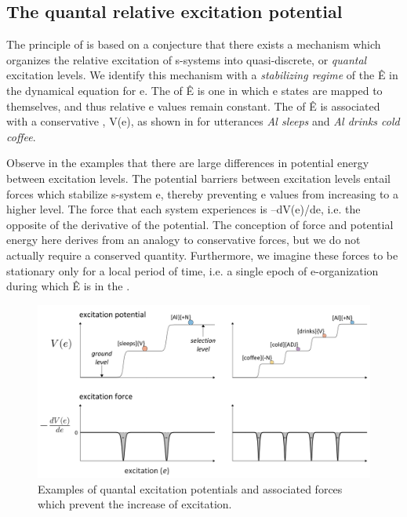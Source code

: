 \subsection{The quantal relative excitation potential}

The principle of  is based on a conjecture that there exists a mechanism which organizes the relative excitation of s-systems into quasi-discrete, or \textit{quantal} excitation levels. We identify this mechanism with a \textit{stabilizing regime} of the  Ê in the dynamical equation for e. The  of Ê is one in which e states are mapped to themselves, and thus relative e values remain constant. The  of Ê is associated with a conservative , V(e), as shown in {} for utterances \textit{Al sleeps} and \textit{Al drinks cold coffee}. 

  Observe in the examples that there are large differences in potential energy between excitation levels. The potential barriers between excitation levels entail forces which stabilize s-system e, thereby preventing e values from increasing to a higher level. The force that each system experiences is –dV(e)/de, i.e. the opposite of the derivative of the potential. The conception of force and potential energy here derives from an analogy to conservative forces, but we do not actually require a conserved quantity. Furthermore, we imagine these forces to be stationary only for a local period of time, i.e. a single epoch of e-organization during which Ê is in the . 

  
\begin{figure}
\includegraphics[width=\textwidth]{figures/Tilsen-img23.png}
\caption{Examples of quantal excitation potentials and associated forces which prevent the increase of excitation.}
\label{fig:2:16}
\end{figure}
 

